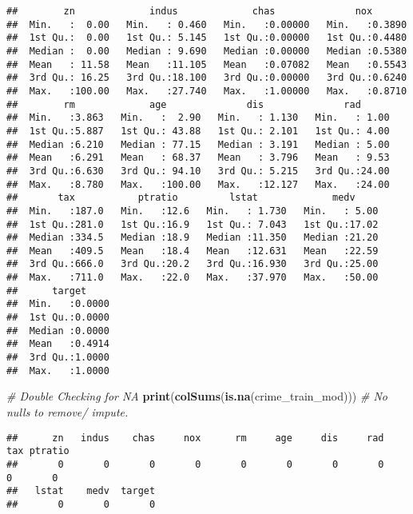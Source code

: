 \documentclass[
]{article}
\newenvironment{Shaded}{\begin{snugshade}}{\end{snugshade}}
\newcommand{\CommentTok}[1]{\textcolor[rgb]{0.56,0.35,0.01}{\textit{#1}}}
\newcommand{\FunctionTok}[1]{\textcolor[rgb]{0.13,0.29,0.53}{\textbf{#1}}}
\newcommand{\NormalTok}[1]{#1}
\begin{document}
\begin{verbatim}
##        zn             indus             chas              nox        
##  Min.   :  0.00   Min.   : 0.460   Min.   :0.00000   Min.   :0.3890  
##  1st Qu.:  0.00   1st Qu.: 5.145   1st Qu.:0.00000   1st Qu.:0.4480  
##  Median :  0.00   Median : 9.690   Median :0.00000   Median :0.5380  
##  Mean   : 11.58   Mean   :11.105   Mean   :0.07082   Mean   :0.5543  
##  3rd Qu.: 16.25   3rd Qu.:18.100   3rd Qu.:0.00000   3rd Qu.:0.6240  
##  Max.   :100.00   Max.   :27.740   Max.   :1.00000   Max.   :0.8710  
##        rm             age              dis              rad       
##  Min.   :3.863   Min.   :  2.90   Min.   : 1.130   Min.   : 1.00  
##  1st Qu.:5.887   1st Qu.: 43.88   1st Qu.: 2.101   1st Qu.: 4.00  
##  Median :6.210   Median : 77.15   Median : 3.191   Median : 5.00  
##  Mean   :6.291   Mean   : 68.37   Mean   : 3.796   Mean   : 9.53  
##  3rd Qu.:6.630   3rd Qu.: 94.10   3rd Qu.: 5.215   3rd Qu.:24.00  
##  Max.   :8.780   Max.   :100.00   Max.   :12.127   Max.   :24.00  
##       tax           ptratio         lstat             medv      
##  Min.   :187.0   Min.   :12.6   Min.   : 1.730   Min.   : 5.00  
##  1st Qu.:281.0   1st Qu.:16.9   1st Qu.: 7.043   1st Qu.:17.02  
##  Median :334.5   Median :18.9   Median :11.350   Median :21.20  
##  Mean   :409.5   Mean   :18.4   Mean   :12.631   Mean   :22.59  
##  3rd Qu.:666.0   3rd Qu.:20.2   3rd Qu.:16.930   3rd Qu.:25.00  
##  Max.   :711.0   Max.   :22.0   Max.   :37.970   Max.   :50.00  
##      target      
##  Min.   :0.0000  
##  1st Qu.:0.0000  
##  Median :0.0000  
##  Mean   :0.4914  
##  3rd Qu.:1.0000  
##  Max.   :1.0000
\end{verbatim}

\begin{Shaded}
\begin{Highlighting}[]
\CommentTok{\# Double Checking for NA }
\FunctionTok{print}\NormalTok{(}\FunctionTok{colSums}\NormalTok{(}\FunctionTok{is.na}\NormalTok{(crime\_train\_mod))) }\CommentTok{\# No nulls to remove/ impute.}
\end{Highlighting}
\end{Shaded}

\begin{verbatim}
##      zn   indus    chas     nox      rm     age     dis     rad     tax ptratio 
##       0       0       0       0       0       0       0       0       0       0 
##   lstat    medv  target 
##       0       0       0
\end{verbatim}
\end{document}
